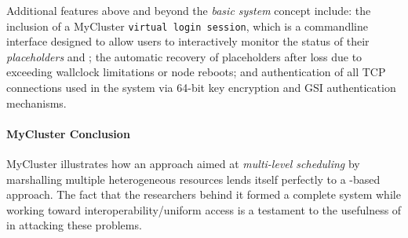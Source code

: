 \documentclass{sig-alternate}
\begin{document}
Additional features above and beyond the \textit{basic \pilotjob system}
concept include: the inclusion of a MyCluster
\texttt{virtual login session}, which
is a commandline interface designed to allow users to interactively
monitor the status of their \textit{placeholders} and \textit{\cus};
the automatic recovery of placeholders after loss due to exceeding wallclock
limitations or node reboots; and authentication of all TCP
connections used in the system via 64-bit key encryption and
GSI authentication mechanisms.

\paragraph{MyCluster Conclusion}
MyCluster illustrates how an approach aimed at \textit{multi-level
scheduling} by marshalling multiple heterogeneous resources lends
itself perfectly to a \pilotjob-based approach.  The fact that
the researchers behind it formed a complete \pilotjob system
while working toward interoperability/uniform access is a testament
to the usefulness of \pilotjobs in attacking these problems.



\end{document}
